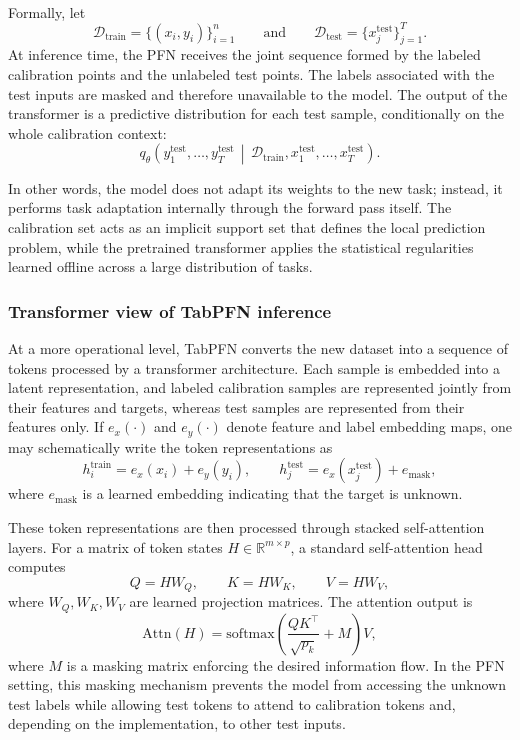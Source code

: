 \documentclass{article}
\begin{document}
~

Formally, let
\[
\mathcal{D}_{\mathrm{train}} = \{(x_i,y_i)\}_{i=1}^{n}
\qquad\text{and}\qquad
\mathcal{D}_{\mathrm{test}} = \{x_j^{\mathrm{test}}\}_{j=1}^{T}.
\]
At inference time, the PFN receives the joint sequence formed by the labeled calibration points and the unlabeled test points. The labels associated with the test inputs are masked and therefore unavailable to the model. The output of the transformer is a predictive distribution for each test sample, conditionally on the whole calibration context:
\[
q_\theta\!\left(
y_1^{\mathrm{test}},\dots,y_T^{\mathrm{test}}
\,\middle|\,
\mathcal{D}_{\mathrm{train}},x_1^{\mathrm{test}},\dots,x_T^{\mathrm{test}}
\right).
\]

In other words, the model does not adapt its weights to the new task; instead, it performs task adaptation internally through the forward pass itself. The calibration set acts as an implicit support set that defines the local prediction problem, while the pretrained transformer applies the statistical regularities learned offline across a large distribution of tasks.



\subsubsection{Transformer view of TabPFN inference}

At a more operational level, TabPFN converts the new dataset into a sequence of tokens processed by a transformer architecture. Each sample is embedded into a latent representation, and labeled calibration samples are represented jointly from their features and targets, whereas test samples are represented from their features only. If $e_x(\cdot)$ and $e_y(\cdot)$ denote feature and label embedding maps, one may schematically write the token representations as
\[
h_i^{\mathrm{train}} = e_x(x_i) + e_y(y_i),
\qquad
h_j^{\mathrm{test}} = e_x(x_j^{\mathrm{test}}) + e_{\mathrm{mask}},
\]
where $e_{\mathrm{mask}}$ is a learned embedding indicating that the target is unknown.

These token representations are then processed through stacked self-attention layers. For a matrix of token states $H \in \mathbb{R}^{m \times p}$, a standard self-attention head computes
\[
Q = HW_Q,\qquad K = HW_K,\qquad V = HW_V,
\]
where $W_Q,W_K,W_V$ are learned projection matrices. The attention output is
\[
\mathrm{Attn}(H)=\mathrm{softmax}\!\left(\frac{QK^\top}{\sqrt{p_k}} + M\right)V,
\]
where $M$ is a masking matrix enforcing the desired information flow. In the PFN setting, this masking mechanism prevents the model from accessing the unknown test labels while allowing test tokens to attend to calibration tokens and, depending on the implementation, to other test inputs.
\end{document}
